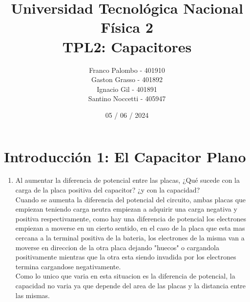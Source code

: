 \documentclass[12pt]{report}
\title{%
  \fontsize{25}{0}\selectfont Universidad Tecnológica Nacional \\
  \fontsize{22}{30}\selectfont Física 2 \\
  \fontsize{18}{25}\selectfont TPL2: Capacitores
}
\author{
  Franco Palombo - 401910\\
  Gaston Grasso - 401892\\
  Ignacio Gil - 401891\\
  Santino Noccetti - 405947\\
}
\date{05 / 06 / 2024}
\begin{document}
\maketitle

\section{Introducción 1: El Capacitor Plano}

\begin{enumerate}
    \item Al aumentar la diferencia de potencial entre las placas, ¿Qué sucede con la carga de la placa positiva del capacitor? ¿y con la capacidad?\\[6pt]
    Cuando se aumenta la diferencia del potencial del circuito, ambas placas que empiezan teniendo carga neutra empiezan a adquirir una carga negativa y positiva respectivamente, como hay una diferencia de potencial los electrones empiezan a moverse en un cierto sentido, en el caso de la placa que esta mas cercana a la terminal positiva de la bateria, los electrones de la misma van a moverse en direccion de la otra placa  dejando "huecos" o cargandola positivamente mientras que la otra esta siendo invadida por los electrones termina cargandose negativamente.\\
    Como lo unico que varia en esta situacion es la diferencia de potencial, la capacidad no varia ya que depende del area de las placas y la distancia entre las mismas.\\


\end{enumerate}
\end{document}
